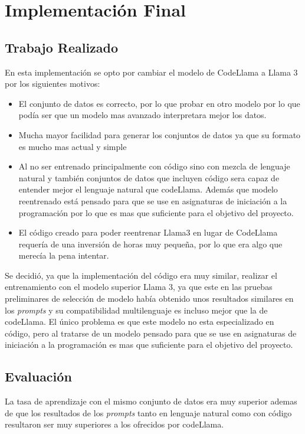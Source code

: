 \chapter{Implementación Final}

\section{Trabajo Realizado}

En esta implementación se opto por cambiar el modelo de CodeLlama a Llama 3
por los siguientes motivos:

\begin{itemize}
    \item El conjunto de datos es correcto, por lo que probar en otro modelo por lo que podía ser que un modelo mas avanzado interpretara mejor los datos.
    \item Mucha mayor facilidad para generar los conjuntos de datos ya que su formato es mucho mas actual y simple \cite{formatoLlama3}
    \item Al no ser entrenado principalmente con código sino con mezcla de lenguaje natural y también conjuntos de datos que incluyen código sera capaz de entender mejor el lenguaje natural que codeLlama. Además que  modelo reentrenado está pensado para que se use en asignaturas de iniciación a la programación por lo que es mas que suficiente para el objetivo del proyecto.
    \item El código creado para poder reentrenar Llama3 en lugar de CodeLlama requería de una inversión de horas muy pequeña, por lo que era algo que merecía la pena intentar.
\end{itemize}

Se decidió, ya que la implementación del código era muy similar, realizar el entrenamiento con el modelo superior Llama 3, ya que este en las pruebas preliminares de selección de modelo había obtenido unos resultados similares en los \textit{prompts} y su compatibilidad multilenguaje es incluso mejor que la de codeLlama. El único problema es que este modelo no esta especializado en código, pero al tratarse de un modelo pensado para que se use en asignaturas de iniciación a la programación es mas que suficiente para el objetivo del proyecto.

\section{Evaluación}

La tasa de aprendizaje con el mismo conjunto de datos era muy superior ademas de que los resultados de los \textit{prompts} tanto en lenguaje natural como con código resultaron ser muy superiores a los ofrecidos por codeLlama.

